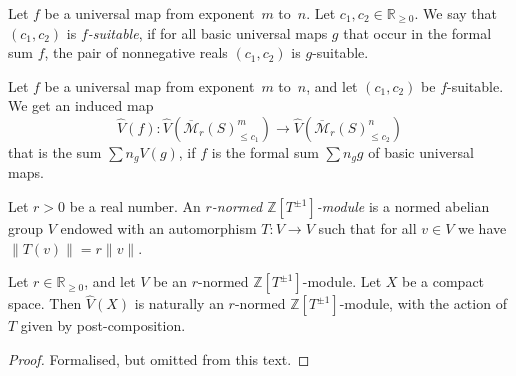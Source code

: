 \begin{definition}
  \label{universal_suitable}
  \leanok
  Let $f$ be a universal map from exponent~$m$ to~$n$.
  Let $c_1, c_2 \in \mathbb R_{\ge 0}$.
  We say that $(c_1, c_2)$ is \emph{$f$-suitable}, if for all basic universal maps $g$
  that occur in the formal sum $f$,
  the pair of nonnegative reals $(c_1, c_2)$ is $g$-suitable.
\end{definition}

\begin{definition}
  \label{Vhat_eval_Mbar}
  \leanok
  Let $f$ be a universal map from exponent~$m$ to~$n$,
  and let $(c_1, c_2)$ be $f$-suitable.
  We get an induced map
  \[
    \hat V(f) \colon
    \hat V(\overline{\mathcal M}_r(S)_{\le c_1}^m) \to
    \hat V(\overline{\mathcal M}_r(S)_{\le c_2}^n)
  \]
  that is the sum $\sum n_g V(g)$,
  if $f$ is the formal sum $\sum n_g g$
  of basic universal maps.
\end{definition}

\begin{definition}
  \label{normed_with_aut}
  \leanok
  Let $r > 0$ be a real number.
  An \emph{$r$-normed $\mathbb Z[T^{\pm 1}]$-module}
  is a normed abelian group $V$
  endowed with an automorphism $T \colon V \to V$ such that
  for all $v \in V$ we have $\|T(v)\| = r\|v\|$.
\end{definition}

\begin{lemma}
  \label{Vhat_normed_with_aut}
  \leanok
  Let $r \in \mathbb R_{\ge 0}$,
  and let $V$ be an $r$-normed $\mathbb Z[T^{\pm 1}]$-module.
  Let $X$ be a compact space.
  Then $\hat V(X)$ is naturally an $r$-normed $\mathbb Z[T^{\pm 1}]$-module,
  with the action of $T$ given by post-composition.
\end{lemma}

\begin{proof}
  \leanok
  Formalised, but omitted from this text.
\end{proof}

